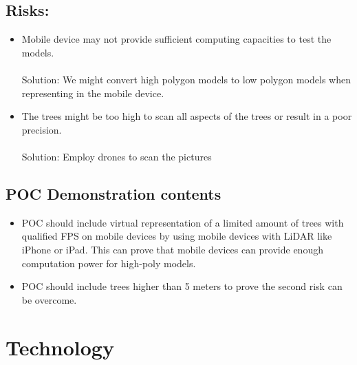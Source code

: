 \documentclass{article}
\begin{document}
\subsection{Risks:}
\begin{itemize}
    \item Mobile device may not provide sufficient computing capacities to test the models.\\\\ 
        Solution: We might convert high polygon models to low polygon models when representing in the mobile device. 
        
    \item The trees might be too high to scan all aspects of the trees or result in a poor precision.\\\\
        Solution: Employ drones to scan the pictures
\end{itemize}

\subsection{POC Demonstration contents}
\begin{itemize}
    \item POC should include virtual representation of a limited amount
    of trees with qualified FPS on mobile 
    devices by using mobile devices with LiDAR like iPhone or iPad. 
    This can prove that mobile devices can provide enough computation power for high-poly models.
    \item POC should include trees higher than 5 meters to prove the second risk can be
    overcome.
\end{itemize}
\section{Technology}
\end{document}
